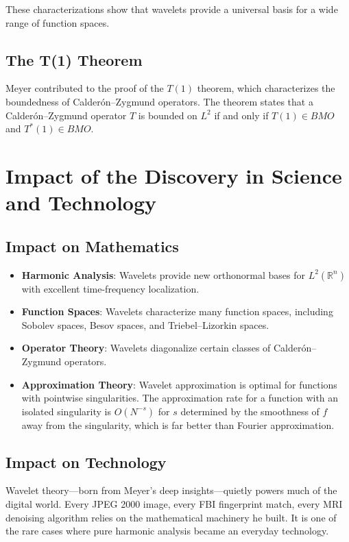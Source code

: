 These characterizations show that wavelets provide a universal basis for a wide range of function spaces.

\subsection{The T(1) Theorem}

Meyer contributed to the proof of the $T(1)$ theorem, which characterizes the boundedness of Calder\'on--Zygmund operators. The theorem states that a Calder\'on--Zygmund operator $T$ is bounded on $L^2$ if and only if $T(1) \in BMO$ and $T^*(1) \in BMO$.

\section{Impact of the Discovery in Science and Technology}

\subsection{Impact on Mathematics}

\begin{itemize}
\item \textbf{Harmonic Analysis}: Wavelets provide new orthonormal bases for $L^2(\mathbb{R}^n)$ with excellent time-frequency localization.
\item \textbf{Function Spaces}: Wavelets characterize many function spaces, including Sobolev spaces, Besov spaces, and Triebel--Lizorkin spaces.
\item \textbf{Operator Theory}: Wavelets diagonalize certain classes of Calder\'on--Zygmund operators.
\item \textbf{Approximation Theory}: Wavelet approximation is optimal for functions with pointwise singularities. The approximation rate for a function with an isolated singularity is $O(N^{-s})$ for $s$ determined by the smoothness of $f$ away from the singularity, which is far better than Fourier approximation.
\end{itemize}

\subsection{Impact on Technology}

\begin{whyitmatters}
Wavelet theory---born from Meyer's deep insights---quietly powers
much of the digital world. Every JPEG 2000 image, every FBI
fingerprint match, every MRI denoising algorithm relies on the
mathematical machinery he built. It is one of the rare cases where
pure harmonic analysis became an everyday technology.
\end{whyitmatters}

